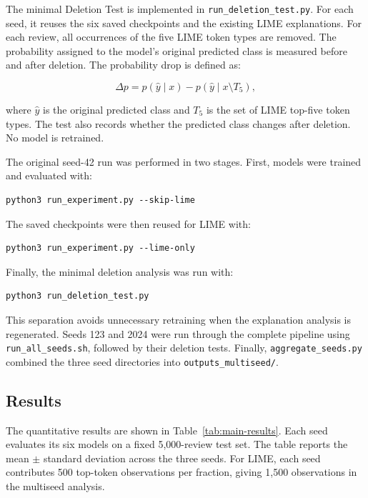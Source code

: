 \documentclass[11pt]{article}
\begin{document}
The minimal Deletion Test is implemented in \texttt{run\_deletion\_test.py}. For each seed, it reuses the six saved checkpoints and the existing LIME explanations. For each review, all occurrences of the five LIME token types are removed. The probability assigned to the model's original predicted class is measured before and after deletion. The probability drop is defined as:

\begin{equation}
\Delta p = p(\hat{y}\mid x) - p(\hat{y}\mid x \setminus T_5),
\end{equation}

where $\hat{y}$ is the original predicted class and $T_5$ is the set of LIME top-five token types. The test also records whether the predicted class changes after deletion. No model is retrained.

The original seed-42 run was performed in two stages. First, models were trained and evaluated with:

\begin{verbatim}
python3 run_experiment.py --skip-lime
\end{verbatim}

The saved checkpoints were then reused for LIME with:

\begin{verbatim}
python3 run_experiment.py --lime-only
\end{verbatim}

Finally, the minimal deletion analysis was run with:

\begin{verbatim}
python3 run_deletion_test.py
\end{verbatim}

This separation avoids unnecessary retraining when the explanation analysis is regenerated. Seeds 123 and 2024 were run through the complete pipeline using \texttt{run\_all\_seeds.sh}, followed by their deletion tests. Finally, \texttt{aggregate\_seeds.py} combined the three seed directories into \texttt{outputs\_multiseed/}.

\subsection{Results}

The quantitative results are shown in Table~\ref{tab:main-results}. Each seed evaluates its six models on a fixed 5,000-review test set. The table reports the mean $\pm$ standard deviation across the three seeds. For LIME, each seed contributes 500 top-token observations per fraction, giving 1,500 observations in the multiseed analysis.
\end{document}
